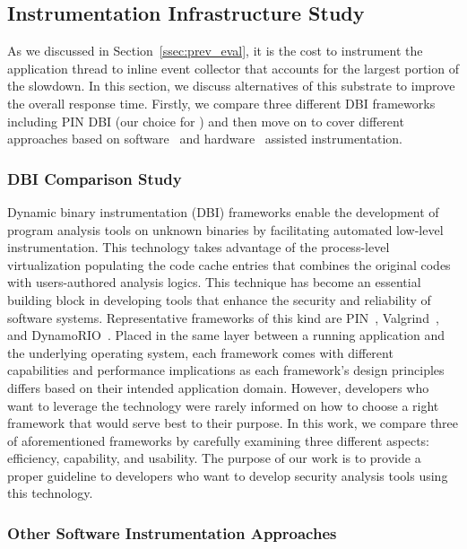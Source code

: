\subsection{Instrumentation Infrastructure Study}
\label{ssec:inst_infra}

As we discussed in Section~\ref{ssec:prev_eval}, it is the cost to
instrument the application thread to inline event collector that accounts for
the largest portion of the slowdown. In this section, we discuss 
alternatives of this substrate to improve the overall response time. Firstly,
we compare three different DBI frameworks including PIN DBI (our choice for
\sreplica) and then move on to cover different approaches based on
software~\cite{brewriting:usenix2003, DTrace} and
hardware~\cite{raksha:isca2007, lba:isca2008} assisted instrumentation. 

\subsubsection{DBI Comparison Study} 
\label{ssec:dbi_study}

Dynamic binary instrumentation (DBI) frameworks enable the development of
program analysis tools on unknown binaries by facilitating automated low-level
instrumentation. This technology takes advantage of the process-level
virtualization populating the code cache entries that combines the original codes
with users-authored analysis logics. This technique has become an essential
building block in developing tools that enhance the security and reliability
of software systems.  Representative frameworks of this kind are
PIN~\cite{pin:pldi2005}, Valgrind~\cite{valgrind}, and
DynamoRIO~\cite{dynamorio}.
%
Placed in the same layer between a running application and the underlying operating
system, each framework comes with different capabilities and performance
implications as each framework’s design principles differs based on their intended
application domain. However, developers who want to leverage the technology
were rarely informed on how to choose a right framework that would serve
best to their purpose.
%
In this work, we compare three of aforementioned frameworks by carefully examining
three different aspects: efficiency, capability, and usability. The purpose of our
work is to provide a proper guideline to developers who want to develop
security analysis tools using this technology.

\subsubsection{Other Software Instrumentation Approaches}
\label{ssec:sw_inst}

